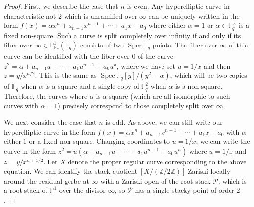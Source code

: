 \documentclass[12 pt]{amsart}
\theoremstyle{plain}
\theoremstyle{definition}
\theoremstyle{remark}
\numberwithin{equation}{section}
\DeclareMathOperator\spec{Spec}
\begin{document}
\begin{proof}
First, we describe the case that $n$ is even.
Any hyperelliptic curve in characteristic not $2$ which is unramified over
$\infty$ can be uniquely written in the form
$f(x) =  \alpha x^n + a_{n-1}x^{n-1} + \cdots + a_1x + a_0$
where either $\alpha = 1$ or $\alpha \in \mathbb F_q^\times$ is a fixed
non-square.
Such a curve is split completely over infinity if and only if its
fiber over $\infty \in \mathbb P^1_{\mathbb F_q}(\mathbb F_q)$ consists of two
$\spec \mathbb F_q$ points.
The fiber over $\infty$ of this curve can be identified with the fiber over $0$
of the curve
$z^2 =  \alpha + a_{n-1}u + \cdots + a_1u^{n-1} + a_0u^n$, where we have set $u
= 1/x$ and then $z = y/x^{n/2}$.
This is the same as $\spec \mathbb F_q[y]/(y^2 - \alpha)$, which will be two
copies of $\mathbb F_q$ when $\alpha$ is a square and a single copy of $\mathbb
F_q^2$ when $\alpha$ is a non-square.
Therefore, the curves where $\alpha$ is a square (which are all isomorphic to
such curves with $\alpha = 1$) precisely correspond to those completely split over
$\infty$.

We next consider the case that $n$ is odd.
As above, we can still write our hyperelliptic curve in the form
$f(x) =  \alpha x^n + a_{n-1}x^{n-1} + \cdots + a_1x + a_0$
with $\alpha$ either $1$ or a fixed non-square.
Changing coordinates to $u = 1/x$, we can write the curve in
the form
$z^2 =  u(\alpha + a_{n-1}u + \cdots + a_1u^{n-1} + a_0u^n)$
where $u = 1/x$ and $z = y/x^{n+1/2}$.
Let $X$ denote the proper regular curve corresponding to the above equation.
We can identify the stack quotient $[X/(\mathbb Z/2 \mathbb Z)]$ Zariski locally
around the residual gerbe at $\infty$
with a Zariski open of the root stack $\mathscr P$, which is a
root stack of $\mathbb P^1$ over the divisor $\infty$, so $\mathscr P$ has a single stacky point of order
$2$.


\end{proof}
\end{document}
